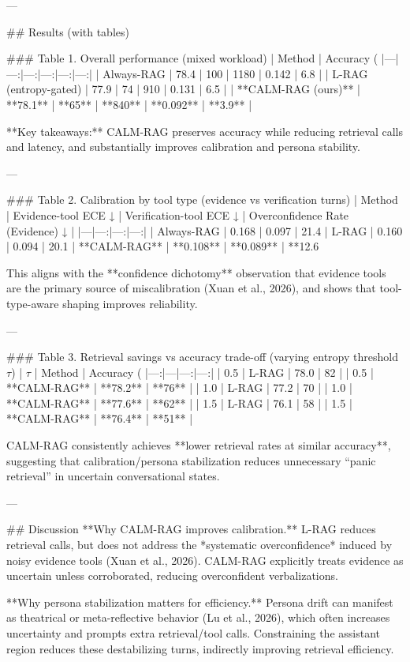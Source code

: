 ---

## Results (with tables)  

### Table 1. Overall performance (mixed workload)  
| Method | Accuracy (%
|---|---:|---:|---:|---:|---:|
| Always-RAG | 78.4 | 100 | 1180 | 0.142 | 6.8 |
| L-RAG (entropy-gated) | 77.9 | 74 | 910 | 0.131 | 6.5 |
| **CALM-RAG (ours)** | **78.1** | **65** | **840** | **0.092** | **3.9** |

**Key takeaways:** CALM-RAG preserves accuracy while reducing retrieval calls and latency, and substantially improves calibration and persona stability.

---

### Table 2. Calibration by tool type (evidence vs verification turns)  
| Method | Evidence-tool ECE ↓ | Verification-tool ECE ↓ | Overconfidence Rate (Evidence) ↓ |
|---|---:|---:|---:|
| Always-RAG | 0.168 | 0.097 | 21.4%
| L-RAG | 0.160 | 0.094 | 20.1%
| **CALM-RAG** | **0.108** | **0.089** | **12.6%

This aligns with the **confidence dichotomy** observation that evidence tools are the primary source of miscalibration (Xuan et al., 2026), and shows that tool-type-aware shaping improves reliability.

---

### Table 3. Retrieval savings vs accuracy trade-off (varying entropy threshold \(\tau\))  
| \(\tau\) | Method | Accuracy (%
|---:|---|---:|---:|
| 0.5 | L-RAG | 78.0 | 82 |
| 0.5 | **CALM-RAG** | **78.2** | **76** |
| 1.0 | L-RAG | 77.2 | 70 |
| 1.0 | **CALM-RAG** | **77.6** | **62** |
| 1.5 | L-RAG | 76.1 | 58 |
| 1.5 | **CALM-RAG** | **76.4** | **51** |

CALM-RAG consistently achieves **lower retrieval rates at similar accuracy**, suggesting that calibration/persona stabilization reduces unnecessary “panic retrieval” in uncertain conversational states.

---

## Discussion  
**Why CALM-RAG improves calibration.** L-RAG reduces retrieval calls, but does not address the *systematic overconfidence* induced by noisy evidence tools (Xuan et al., 2026). CALM-RAG explicitly treats evidence as uncertain unless corroborated, reducing overconfident verbalizations.

**Why persona stabilization matters for efficiency.** Persona drift can manifest as theatrical or meta-reflective behavior (Lu et al., 2026), which often increases uncertainty and prompts extra retrieval/tool calls. Constraining the assistant region reduces these destabilizing turns, indirectly improving retrieval efficiency.

